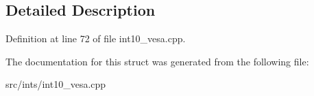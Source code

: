 \subsection{Detailed Description}


Definition at line 72 of file int10\-\_\-vesa.\-cpp.



The documentation for this struct was generated from the following file\-:\begin{DoxyCompactItemize}
\item 
src/ints/int10\-\_\-vesa.\-cpp\end{DoxyCompactItemize}
